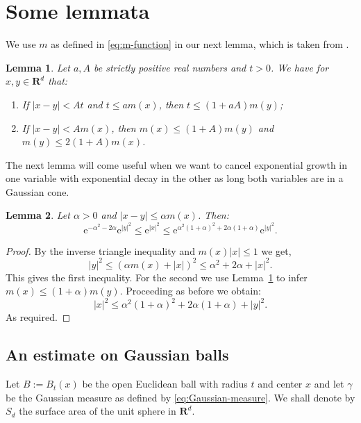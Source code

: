 \documentclass[preprint,12pt]{elsarticle}
\newtheorem{lemma}{Lemma}
\theoremstyle{remark}
\renewcommand{\leq}{\leqslant}
\newcommand{\R}{\mathbf R}
\newcommand{\e}{\mathrm{e}} %
\begin{document}
\section{Some lemmata}
We use $m$ as defined in \eqref{eq:m-function} in our next lemma,
which is taken from \cite{MaasNeervenPortal2011}.
\begin{lemma}\label{lem:m-xy-equivalence}
  Let $a, A$ be strictly positive real numbers and $t > 0$. We have
  for $x, y \in \R^d$ that:
  \begin{enumerate}
  \item If $|x - y| < A t$ and $t \leq a m(x)$, then $t
    \leq (1 + aA) m(y)$;
  \item If $|x - y| < A m(x)$, then $m(x) \leq (1 +
    A) m(y)$ and $m(y) \leq 2 (1 + A) m(x)$. 
  \end{enumerate}
\end{lemma}

The next lemma will come useful when we want to cancel exponential
growth in one variable with exponential decay in the other as long
both variables are in a Gaussian cone.
\begin{lemma}\label{lem:Cone-Gaussians-comparable}
  Let $\alpha > 0$ and $|x - y| \leq \alpha m(x)$. Then:
  \begin{equation*}
    \e^{-\alpha^2-2\alpha} \e^{|y|^2}
    \leq \e^{|x|^2} \leq
    \e^{\alpha^2(1 + \alpha)^2+2\alpha(1 + \alpha)} \e^{|y|^2} .
  \end{equation*}
\end{lemma}
\begin{proof}
  By the inverse triangle inequality and $m(x)|x| \leq 1$ we get, 
  \begin{equation*}
    |y|^2 \leq (\alpha m(x) + |x|)^2 \leq \alpha^2 + 2 \alpha + |x|^2.
  \end{equation*}
  This gives the first inequality.  For the second we use
  Lemma~\ref{lem:m-xy-equivalence} to infer $m(x) \leq (1 + \alpha)
  m(y)$. Proceeding as before we obtain: 
  \begin{equation*}
    |x|^2 \leq \alpha^2 (1 + \alpha)^2 + 2 \alpha (1 + \alpha) + |y|^2.
  \end{equation*}
  As required.
\end{proof}

\subsection{An estimate on Gaussian balls}
Let $B := B_t(x)$ be the open Euclidean ball with radius $t$ and center $x$
and let $\gamma$ be the Gaussian measure as defined by
\eqref{eq:Gaussian-measure}. We shall denote by $S_d$ the surface area 
of the unit sphere in $\R^d$.
\end{document}
